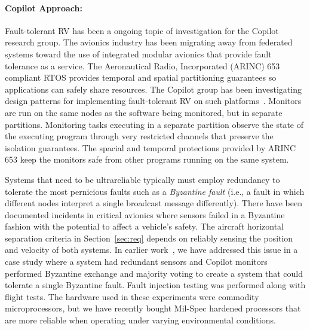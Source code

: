 \paragraph{Copilot Approach:} Fault-tolerant RV has been a ongoing
topic of investigation for the Copilot research group. The avionics
industry has been migrating away from federated systems toward the use
of integrated modular avionics that provide fault tolerance as a
service.  The Aeronautical Radio, Incorporated (ARINC)
653~\cite{ARINC653} compliant RTOS
provides temporal and spatial partitioning guarantees so applications
can safely share resources.  The Copilot group has been investigating
design patterns for implementing fault-tolerant RV on such
platforms~\cite{Kaveh15}. Monitors are run on the same nodes as the
software being monitored, but in separate partitions. Monitoring tasks
executing in a separate partition observe the state of the executing
program through very restricted
channels that preserve the isolation guarantees.  The spacial and
temporal protections provided by ARINC 653 keep the monitors safe from
other programs running on the same system.

Systems that need to  be ultrareliable typically must employ redundancy to
tolerate the most pernicious faults such as a \emph{Byzantine fault}
(i.e., a fault in which different nodes interpret a single broadcast
message differently).  There  have been  documented incidents in
critical avionics  where sensors failed in a Byzantine fashion with
the potential to affect a vehicle's safety.  The aircraft horizontal separation criteria in
Section~\ref{sec:req} depends on reliably sensing the position and
velocity of both systems. In earlier work~\cite{pike-isse-13}, we have
 addressed this issue in a case study where a system had
redundant sensors and Copilot monitors performed Byzantine exchange and 
majority voting to create a system that could tolerate a single
Byzantine fault.  Fault injection testing was
performed along with flight tests.  The hardware used in these
experiments were commodity microprocessors, but we have recently
bought Mil-Spec hardened processors that are more reliable when operating
under varying environmental conditions.






